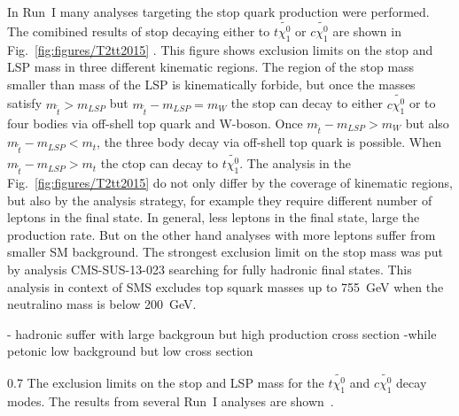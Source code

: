 In Run~I many analyses targeting the stop quark production were performed. The comibined results of stop decaying either to $t \tilde{\chi_{1}^0}$ or $c \tilde{\chi_{1}^0}$ are shown in Fig.~\ref{fig:figures/T2tt2015} . This figure shows exclusion limits on the stop and LSP mass in three different kinematic regions. The region of the stop mass smaller than mass of the LSP is kinematically forbide, but once the masses satisfy $m_{\tilde{t}} > m_{LSP}$ but $m_{\tilde{t}} - m_{LSP} = m_{W}$ the stop can decay to either $c \tilde{\chi_{1}^0}$ or to four bodies via off-shell top quark and W-boson. Once  $m_{\tilde{t}} - m_{LSP} > m_{W}$ but also  $m_{\tilde{t}} - m_{LSP} < m_{t}$, the three body decay via off-shell top quark is possible. When  $m_{\tilde{t}} - m_{LSP} > m_{t}$  the ctop can decay to $t \tilde{\chi_{1}^0}$. The analysis in the Fig.~\ref{fig:figures/T2tt2015} do not only differ by the coverage of kinematic regions, but also by the analysis strategy, for example they require different number of leptons in the final state. In general, less leptons in the final state, large the production rate. But on the other hand analyses with more leptons suffer from smaller SM background.  The strongest exclusion limit on the stop mass was put by analysis CMS-SUS-13-023 searching for fully hadronic final states. This analysis in context of SMS excludes  top squark masses up to 755~GeV when the neutralino mass is below 200~GeV.

	- hadronic suffer with large backgroun but high production cross section
	-while petonic low background but low cross section

                 {0.7}       %
                { The exclusion limits on the stop and LSP mass for the $t \tilde{\chi_{1}^0}$ and $c \tilde{\chi_{1}^0}$ decay modes. The results from several Run~I analyses are shown~\cite{website:SUSYresRunI}.   } %
